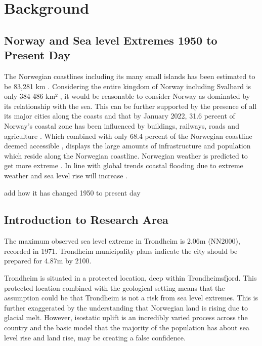 \chapter{Background}

\section{Norway and Sea level Extremes 1950 to Present Day}
The Norwegian coastlines including its many small islands has been estimated to be 83,281 km \cite{aunan_strong_2008}. Considering the entire kingdom of Norway including Svalbard is only 384 486 km² \cite{engelien_area_2022}, it would be reasonable to consider Norway as dominated by its relationship with the sea. This can be further supported by the presence of all its major cities along the coasts and that by January 2022, 31.6 percent of Norway's coastal zone has been influenced by buildings, railways, roads and agriculture \cite{engebakken_construction_2022}. Which combined with only 68.4 percent of the Norwegian coastline deemed accessible \cite{engebakken_construction_2022}, displays the large amounts of infrastructure and population which reside along the Norwegian coastline. Norwegian weather is predicted to get more extreme \cite{rod_integrated_2012}. In line with global trends coastal flooding due to extreme weather and sea level rise will increase \cite{hoffken_effects_2020}. 

add how it has changed 1950 to present day 

\section{Introduction to Research Area}

The maximum observed sea level extreme in Trondheim is 2.06m (NN2000), recorded in 1971. Trondheim municipality plans indicate the city should be prepared for 4.87m by 2100. 

Trondheim is situated in a protected location, deep within Trondheimsfjord. This protected location combined with the geological setting means that the assumption could be that Trondheim is not a risk from sea level extremes. This is further exaggerated by the understanding that Norwegian land is rising due to glacial melt. However, isostatic uplift is an incredibly varied process across the country and the basic model that the majority of the population has about sea level rise and land rise, may be creating a false confidence. 

